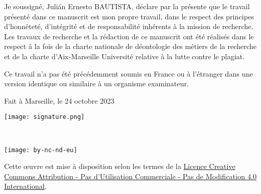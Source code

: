 \iftrue %
    Je soussigné, Julián Ernesto BAUTISTA, %
    déclare par la présente que le travail présenté dans ce manuscrit est mon propre travail, 
    dans le respect des principes d'honnêteté, d'intégrité et de responsabilité inhérents à la mission de recherche. Les travaux de recherche et la 
    rédaction de ce manuscrit ont été réalisés dans le respect à la fois de la charte nationale de déontologie des métiers de la recherche et de la 
    charte d'Aix-Marseille Université relative à la lutte contre le plagiat.
    
    Ce travail n'a pas été précédemment soumis en France ou à l'étranger dans une version identique ou similaire à un organisme examinateur.
    
    Fait à Marseille, le 24 octobre 2023
    
    \begin{flushright}\texttt{[image: signature.png]}\end{flushright}%
\fi

\iffalse %
    I, undersigned, Julián Ernesto BAUTISTA, %
    hereby declare that the work presented in this manuscript is my own work, %
    in accordance with the principles of honesty, integrity and responsibility inherent to the research mission. The research work and the writing of this manuscript have been carried out in compliance with both the french national charter for Research Integrity and the Aix-Marseille University charter on the fight against plagiarism.
    
    This work has not been submitted previously either in this country or in another country in the same or in a similar version to any other examination body.
    
    Marseille, [date]
    
    \begin{flushright}\texttt{[image: example-image-b]}\texttt{[image: example-image-a]}\end{flushright} %
\fi

~\vfill
\begin{center}
	\begin{minipage}[c]{0.25\linewidth}
		\texttt{[image: by-nc-nd-eu]}
	\end{minipage}\hfill
\end{center}

Cette \oe{}uvre est mise à disposition selon les termes de la \href{https://creativecommons.org/licenses/by-nc-nd/4.0/deed.fr}{Licence Creative Commons Attribution - Pas d'Utilisation Commerciale - Pas de Modification 4.0 International}. %
